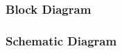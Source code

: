 \documentclass{article}
\begin{document}

    \subsubsection{Block Diagram}

    
    \subsubsection{Schematic Diagram}
\end{document}
